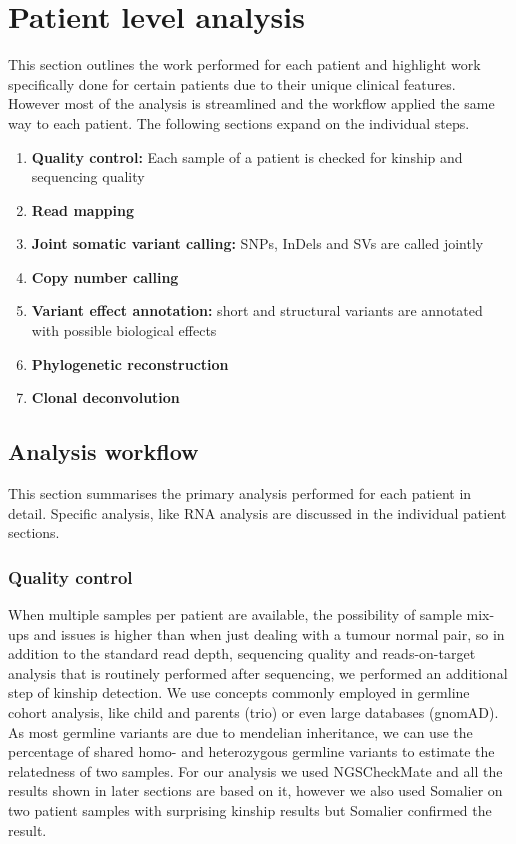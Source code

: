 \section{Patient level analysis}
\label{cascade-sec:patientLevel}
This section outlines the work performed for each patient and highlight work specifically done for certain patients due to their unique clinical features. However most of the analysis is streamlined and the workflow applied the same way to each patient. The following sections expand on the individual steps.
\begin{enumerate}
\item \textbf{Quality control:} Each sample of a patient is checked for kinship and sequencing quality
\item \textbf{Read mapping}
\item \textbf{Joint somatic variant calling:} SNPs, InDels and SVs are called jointly
\item \textbf{Copy number calling}
\item \textbf{Variant effect annotation:} short and structural variants are annotated with possible biological effects
\item \textbf{Phylogenetic reconstruction}
\item \textbf{Clonal deconvolution}
\end{enumerate}

\subsection{Analysis workflow}
\label{cascade-sec:workflow}
This section summarises the primary analysis performed for each patient in detail. Specific analysis, like RNA analysis are discussed in the individual patient sections. 

\subsubsection{Quality control}
\label{cascade-sec:qc}
When multiple samples per patient are available, the possibility of sample mix-ups and issues is higher than when just dealing with a tumour normal pair, so in addition to the standard read depth, sequencing quality and reads-on-target analysis that is routinely performed after sequencing, we performed an additional step of kinship detection. We use concepts commonly employed in germline cohort analysis, like child and parents (trio) or even large databases (gnomAD). As most germline variants are due to mendelian inheritance, we can use the percentage of shared homo- and heterozygous germline variants to estimate the relatedness of two samples. For our analysis we used NGSCheckMate \cite{Lee2017} and all the results shown in later sections are based on it, however we also used Somalier \cite{Pedersen2020} on two patient samples with surprising kinship results but Somalier confirmed the result.

